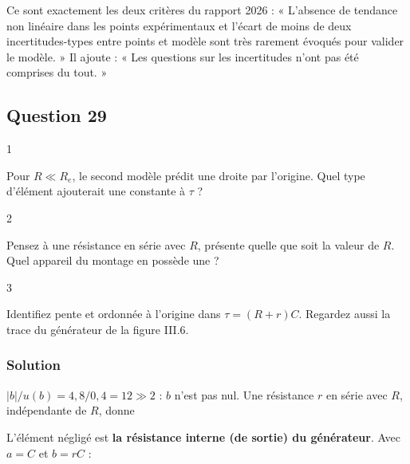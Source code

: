 \documentclass[11pt,a4paper]{article}
\newcommand{\equationajustee}[1]{%
  \sbox{\boiteequation}{$\displaystyle #1$}%
  \ifdim\wd\boiteequation>\linewidth
    \[\resizebox{\linewidth}{!}{\usebox{\boiteequation}}\]%
  \else
    \[#1\]%
  \fi}
\begin{document}
\begin{jury}

Ce sont exactement les deux critères du rapport 2026 : « L'absence de tendance non linéaire dans les points expérimentaux et l'écart de moins de deux incertitudes-types entre points et modèle sont très rarement évoqués pour valider le modèle. » Il ajoute : « Les questions sur les incertitudes n'ont pas été comprises du tout. »

\end{jury}

\hypertarget{question-29}{%
\subsection{Question 29}\label{question-29}}

\begin{indication}{1}

Pour \(R\ll R_e\), le second modèle prédit une droite par l'origine. Quel type d'élément ajouterait une constante à \(\tau\) ?

\end{indication}

\begin{indication}{2}

Pensez à une résistance en série avec \(R\), présente quelle que soit la valeur de \(R\). Quel appareil du montage en possède une ?

\end{indication}

\begin{indication}{3}

Identifiez pente et ordonnée à l'origine dans \(\tau=(R+r)C\). Regardez aussi la trace du générateur de la figure III.6.

\end{indication}

\hypertarget{solution-28}{%
\subsubsection{Solution}\label{solution-28}}

\(|b|/u(b)=4{,}8/0{,}4=12\gg2\) : \(b\) n'est pas nul. Une résistance \(r\) en série avec \(R\), indépendante de \(R\), donne

\equationajustee{\tau=(R+r)C=CR+rC .}

L'élément négligé est \textbf{la résistance interne (de sortie) du générateur}. Avec \(a=C\) et \(b=rC\) :
\end{document}
